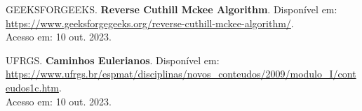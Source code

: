 \documentclass[
	12pt,				
	openright,			
	oneside,			
	a4paper,			
	chapter=TITLE,		
	section=TITLE,		
	sumario=abnt-6027-2012,
	english,			
	brazil,				
	fleqn,				
	]{abntex2}
\begin{document}
\frenchspacing  

\pretextual

					
			

				

\textual

\pagestyle{PagNumReduzida}						



\postextual

	

	
GEEKSFORGEEKS. \textbf{Reverse Cuthill Mckee Algorithm}. Disponível em: \\
\url{https://www.geeksforgegeeks.org/reverse-cuthill-mckee-algorithm/}. \\
Acesso em: 10 out. 2023. 

UFRGS. \textbf{Caminhos Eulerianos}. Disponível em: \\
\url{https://www.ufrgs.br/espmat/disciplinas/novos_conteudos/2009/modulo_I/conteudos1c.htm}. \\
Acesso em: 10 out. 2023. 

				
				
				
		
\end{document}
